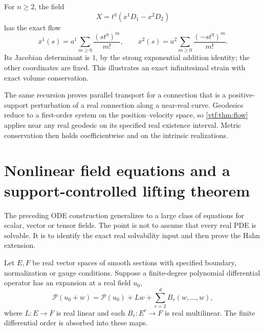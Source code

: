 \documentclass[11pt,letterpaper]{article}
\theoremstyle{definition}
\theoremstyle{remark}
\begin{document}
For $n\ge2$, the field
\[
 X=t^\eta(x^1D_1-x^2D_2)
\]
has the exact flow
\[
 x^1(s)=a^1\sum_{m\ge0}\frac{(s t^\eta)^m}{m!},\qquad
 x^2(s)=a^2\sum_{m\ge0}\frac{(-s t^\eta)^m}{m!}.
\]
Its Jacobian determinant is $1$, by the strong exponential addition identity;
the other coordinates are fixed. This illustrates an exact infinitesimal
strain with exact volume conservation.

The same recursion proves parallel transport for a connection that is a
positive-support perturbation of a real connection along a near-real curve.
Geodesics reduce to a first-order system on the position--velocity space,
so \cref{vtf:thm:flow} applies near any real geodesic on its specified real
existence interval. Metric conservation then holds coefficientwise and on
the intrinsic realizations.

\section{Nonlinear field equations and a support-controlled lifting theorem}\label{vtf:sec:PDE}

The preceding ODE construction generalizes to a large class of equations for
scalar, vector or tensor fields. The point is not to assume that every real
PDE is solvable. It is to identify the exact real solvability input and then
prove the Hahn extension.

Let $E,F$ be real vector spaces of smooth sections with specified boundary,
normalization or gauge conditions. Suppose a finite-degree polynomial
differential operator has an expansion at a real field $u_0$,
\begin{equation}\label{vtf:eq:nonlinear}
 \mathcal P(u_0+w)=\mathcal P(u_0)+Lw+
       \sum_{r=2}^d B_r(w,\ldots,w),
\end{equation}
where $L:E\to F$ is real linear and each $B_r:E^r\to F$ is real multilinear.
The finite differential order is absorbed into these maps.
\end{document}
